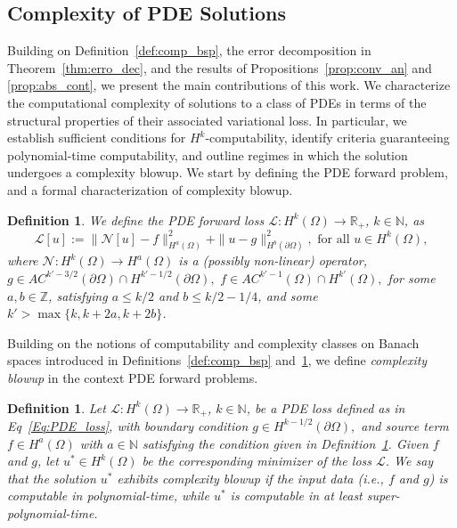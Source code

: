 \documentclass[pdflatex]{sn-jnl}%
\newtheorem{definition}[theorem]{Definition}
\begin{document}
\subsection{Complexity of PDE Solutions}
Building on Definition~\ref{def:comp_bsp}, the error decomposition in Theorem~\ref{thm:erro_dec}, and the results of Propositions~\ref{prop:conv_an} and \ref{prop:abs_cont}, we present the main contributions of this work. We characterize the computational complexity of solutions to a class of PDEs in terms of the structural properties of their associated variational loss. In particular, we establish sufficient conditions for $H^k$-computability, identify criteria guaranteeing polynomial-time computability, and outline regimes in which the solution undergoes a complexity blowup. We start by defining the PDE forward problem, and a formal characterization of complexity blowup. 
\begin{definition}\label{def:gen_PDE_loss}
    We define the PDE forward loss $\mathcal{L}: H^{k}(\Omega)\rightarrow\mathbb{R}_+$, $k\in \mathbb{N}$, as
\begin{equation}\label{Eq:PDE_loss}
    \mathcal{L}[u]:=\|\mathcal{N}[u]-f\|_{H^a(\Omega)}^2+\|u-g\|_{H^{b}(\partial\Omega)}^2,\textrm{ for all } u\in H^k(\Omega),
\end{equation}
where $\mathcal{N}:H^k(\Omega)\rightarrow H^a(\Omega)$ is a (possibly non-linear) operator, $g\in AC^{k'-3/2}(\partial\Omega)\cap H^{k'-1/2}(\partial\Omega),\,\,f\in AC^{k'-1}(\Omega)\cap H^{k'}(\Omega),$ 
for some $a,b\in \mathbb{Z}$, satisfying $a\leq k/2$ and $b\leq k/2-1/4$, and some $k'>\max\{k,k+2a, k+2b\}$.  
\end{definition}
Building on the notions of computability and complexity classes on Banach spaces introduced in Definitions~\ref{def:comp_bsp} and~\ref{def:complexity_blowup}, we define \emph{complexity blowup} in the context PDE forward problems.
\begin{definition}\label{def:complexity_blowup}
    Let $\mathcal{L}: H^{k}(\Omega)\rightarrow\mathbb{R}_+$, $k\in \mathbb{N}$, be a PDE loss defined as in Eq~\ref{Eq:PDE_loss}, with boundary condition $g\in H^{k-1/2}(\partial\Omega),$ and source term $f\in H^{a}(\Omega)$ with $a\in \mathbb{N}$ satisfying the condition given in Definition~\ref{def:gen_PDE_loss}. Given $f$ and $g$, let $u^*\in H^k(\Omega)$ be the corresponding minimizer of the loss $\mathcal{L}$. We say that the solution $u^*$ exhibits \emph{complexity blowup} if the input data (i.e., $f$ and $g$) is computable in polynomial-time, while  $u^*$ is computable in at least super-polynomial-time. 
\end{definition}
\end{document}
